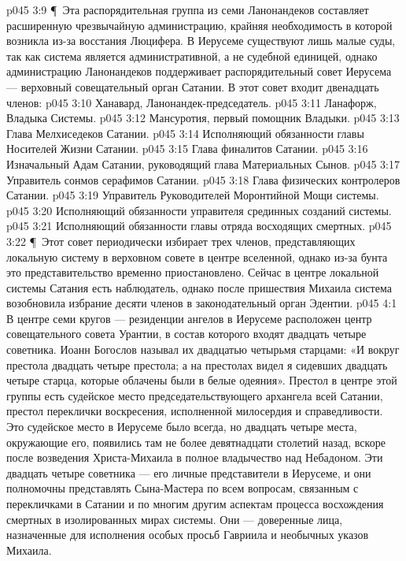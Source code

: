 \vs p045 3:9 \P\ Эта распорядительная группа из семи Ланонандеков составляет расширенную чрезвычайную администрацию, крайняя необходимость в которой возникла из\hyp{}за восстания Люцифера. В Иерусеме существуют лишь малые суды, так как система является административной, а не судебной единицей, однако администрацию Ланонандеков поддерживает распорядительный совет Иерусема --- верховный совещательный орган Сатании. В этот совет входит двенадцать членов:
\vs p045 3:10 \bibnobreakspace Ханавард, Ланонандек\hyp{}председатель.
\vs p045 3:11 \bibnobreakspace Ланафорж, Владыка Системы.
\vs p045 3:12 \bibnobreakspace Мансуротия, первый помощник Владыки.
\vs p045 3:13 \bibnobreakspace Глава Мелхиседеков Сатании.
\vs p045 3:14 \bibnobreakspace Исполняющий обязанности главы Носителей Жизни Сатании.
\vs p045 3:15 \bibnobreakspace Глава финалитов Сатании.
\vs p045 3:16 \bibnobreakspace Изначальный Адам Сатании, руководящий глава Материальных Сынов.
\vs p045 3:17 \bibnobreakspace Управитель сонмов серафимов Сатании.
\vs p045 3:18 \bibnobreakspace Глава физических контролеров Сатании.
\vs p045 3:19 \bibnobreakspace Управитель Руководителей Моронтийной Мощи системы.
\vs p045 3:20 \bibnobreakspace Исполняющий обязанности управителя срединных созданий системы.
\vs p045 3:21 \bibnobreakspace Исполняющий обязанности главы отряда восходящих смертных.
\vs p045 3:22 \P\ Этот совет периодически избирает трех членов, представляющих локальную систему в верховном совете в центре вселенной, однако из\hyp{}за бунта это представительство временно приостановлено. Сейчас в центре локальной системы Сатания есть наблюдатель, однако после пришествия Михаила система возобновила избрание десяти членов в законодательный орган Эдентии.
\vs p045 4:1 В центре семи кругов --- резиденции ангелов в Иерусеме расположен центр совещательного совета Урантии, в состав которого входят двадцать четыре советника. Иоанн Богослов называл их двадцатью четырьмя старцами: «И вокруг престола двадцать четыре престола; а на престолах видел я сидевших двадцать четыре старца, которые облачены были в белые одеяния». Престол в центре этой группы есть судейское место председательствующего архангела всей Сатании, престол переклички воскресения, исполненной милосердия и справедливости. Это судейское место в Иерусеме было всегда, но двадцать четыре места, окружающие его, появились там не более девятнадцати столетий назад, вскоре после возведения Христа\hyp{}Михаила в полное владычество над Небадоном. Эти двадцать четыре советника --- его личные представители в Иерусеме, и они полномочны представлять Сына\hyp{}Мастера по всем вопросам, связанным с перекличками в Сатании и по многим другим аспектам процесса восхождения смертных в изолированных мирах системы. Они --- доверенные лица, назначенные для исполнения особых просьб Гавриила и необычных указов Михаила.
